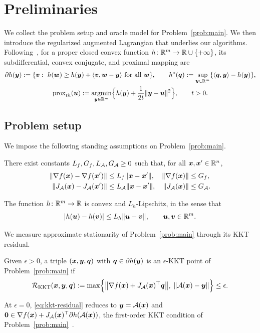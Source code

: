 \section{Preliminaries}
\label{sec:preliminaries}

We collect the problem setup and oracle model for
Problem~\eqref{prob:main}. We then introduce the regularized augmented
Lagrangian that underlies our algorithms. Following~\cite{rockafellar1970convex}, for a proper closed convex function
\(h\colon\mathbb{R}^m\to\mathbb{R}\cup\{+\infty\}\), its subdifferential, convex conjugate,
and proximal mapping are
\begin{gather*}
    \partial h(\bm{y}):=\{\bm{v}:\ h(\bm{w})\ge h(\bm{y})+\langle\bm{v},\bm{w}-\bm{y}\rangle
    \ \text{for all }\bm{w}\},
    \qquad
    h^*(\bm{q}):=\sup_{\bm{y}\in\mathbb{R}^m}\{\langle\bm{q},\bm{y}\rangle-h(\bm{y})\},\\
    \mathrm{prox}_{t h}(\bm{u})
    :=\operatorname*{\mathrm{argmin}}_{\bm{y}\in\mathbb{R}^m}
       \Bigl\{h(\bm{y})+\frac{1}{2t}\|\bm{y}-\bm{u}\|^2\Bigr\}, 
    \qquad t>0.
\end{gather*}

\subsection{Problem setup}
\label{sec:assumptions}
We impose the following standing assumptions on Problem~\eqref{prob:main}. 
\begin{assumption}
\label{ass:smoothness}
There exist constants \(L_f,G_f,L_{\mathcal{A}},G_{\mathcal{A}}\ge0\) such that, for
all \(\bm{x},\bm{x}'\in\mathbb{R}^n\),
\[
\begin{aligned}
    \|\nabla f(\bm{x})-\nabla f(\bm{x}')\|
    &\le L_f\|\bm{x}-\bm{x}'\|,
    &\|\nabla f(\bm{x})\|&\le G_f,\\
    \|J_{\mathcal{A}}(\bm{x})-J_{\mathcal{A}}(\bm{x}')\|
    &\le L_{\mathcal{A}}\|\bm{x}-\bm{x}'\|,
    &\|J_{\mathcal{A}}(\bm{x})\|&\le G_{\mathcal{A}}.
\end{aligned}
\]
\end{assumption}

\begin{assumption}
\label{ass:h}
The function \(h\colon\mathbb{R}^m\to\mathbb{R}\) is convex and \(L_h\)-Lipschitz, in the sense that
\[
    |h(\bm{u})-h(\bm{v})|\le L_h\|\bm{u}-\bm{v}\|,
    \qquad \bm{u},\bm{v}\in\mathbb{R}^m.
\]
\end{assumption}

We measure approximate stationarity of Problem~\eqref{prob:main} through its
KKT residual.
\begin{definition}
\label{def:eps-kkt}
Given \(\epsilon>0\), a triple \((\bm{x},\bm{y},\bm{q})\) with
\(\bm{q}\in\partial h(\bm{y})\) is an \(\epsilon\)-KKT point of
Problem~\eqref{prob:main} if
\begin{equation}
    \mathcal{R}_{\mathrm{KKT}}(\bm{x},\bm{y},\bm{q})
    :=
    \max\Bigl\{
        \bigl\|\nabla f(\bm{x})+J_{\mathcal{A}}(\bm{x})^\top\bm{q}\bigr\|,\;
        \|\mathcal{A}(\bm{x})-\bm{y}\|
    \Bigr\} \leq \epsilon .
    \label{eq:kkt-residual}
\end{equation}
\end{definition}
At \(\epsilon=0\), \eqref{eq:kkt-residual} reduces to \(\bm{y}=\mathcal{A}(\bm{x})\) and
\(\bm{0}\in\nabla f(\bm{x})+J_{\mathcal{A}}(\bm{x})^\top\partial h(\mathcal{A}(\bm{x}))\), the
first-order KKT condition of Problem~\eqref{prob:main}~\cite{li2020understanding}.

